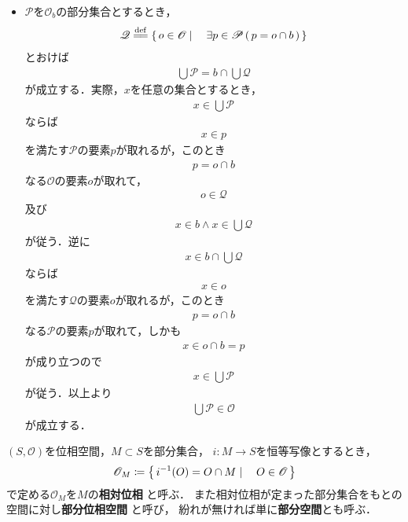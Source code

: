 \begin{itemize}
		\item $\mathscr{P}$を$\mathscr{O}_{b}$の部分集合とするとき，
			\begin{align}
				\mathscr{Q} \defeq \Set{o \in \mathscr{O}}{\exists p \in \mathscr{P}\,
				(\, p = o \cap b\, )}
			\end{align}
			とおけば
			\begin{align}
				\bigcup \mathscr{P} = b \cap \bigcup \mathscr{Q}
			\end{align}
			が成立する．実際，$x$を任意の集合とするとき，
			\begin{align}
				x \in \bigcup \mathscr{P}
			\end{align}
			ならば
			\begin{align}
				x \in p
			\end{align}
			を満たす$\mathscr{P}$の要素$p$が取れるが，このとき
			\begin{align}
				p = o \cap b
			\end{align}
			なる$\mathscr{O}$の要素$o$が取れて，
			\begin{align}
				o \in \mathscr{Q}
			\end{align}
			及び
			\begin{align}
				x \in b \wedge x \in \bigcup \mathscr{Q}
			\end{align}
			が従う．逆に
			\begin{align}
				x \in b \cap \bigcup \mathscr{Q}
			\end{align}
			ならば
			\begin{align}
				x \in o
			\end{align}
			を満たす$\mathscr{Q}$の要素$o$が取れるが，このとき
			\begin{align}
				p = o \cap b
			\end{align}
			なる$\mathscr{P}$の要素$p$が取れて，しかも
			\begin{align}
				x \in o \cap b = p
			\end{align}
			が成り立つので
			\begin{align}
				x \in \bigcup \mathscr{P}
			\end{align}
			が従う．以上より
			\begin{align}
				\bigcup \mathscr{P} \in \mathscr{O} 
			\end{align}
			が成立する．
	\end{itemize}
	
	\begin{screen}
		\begin{dfn}[相対位相]
			$(S,\mathscr{O})$を位相空間，$M \subset S$を部分集合，
			$i:M \longrightarrow S$を恒等写像とするとき，
			\begin{align}
				\mathscr{O}_M \coloneqq 
				\left\{\, i^{-1}(O) = O \cap M \mid \quad O \in \mathscr{O}\, \right\}
			\end{align}
			で定める$\mathscr{O}_M$を$M$の{\bf 相対位相}
			と呼ぶ．
			また相対位相が定まった部分集合をもとの空間に対し{\bf 部分位相空間}
			と呼び，
			紛れが無ければ単に{\bf 部分空間}とも呼ぶ．
		\end{dfn}
	\end{screen}
	
